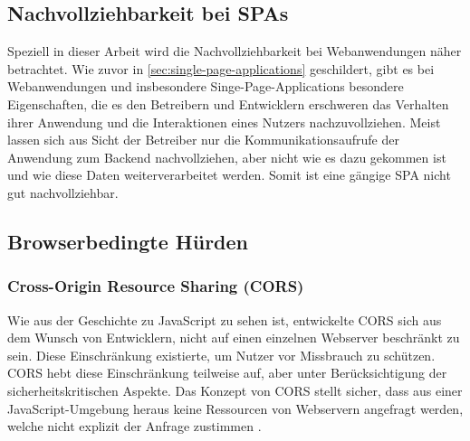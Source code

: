 \subsection{Nachvollziehbarkeit bei SPAs}
\label{sec:nachvollziehbarkeit-bei-spas}

Speziell in dieser Arbeit wird die Nachvollziehbarkeit bei Webanwendungen näher betrachtet. Wie zuvor in \autoref{sec:single-page-applications} geschildert, gibt es bei Webanwendungen und insbesondere Singe-Page-Applications besondere Eigenschaften, die es den Betreibern und Entwicklern erschweren das Verhalten ihrer Anwendung und die Interaktionen eines Nutzers nachzuvollziehen. Meist lassen sich aus Sicht der Betreiber nur die Kommunikationsaufrufe der Anwendung zum Backend nachvollziehen, aber nicht wie es dazu gekommen ist und wie diese Daten weiterverarbeitet werden. Somit ist eine gängige SPA nicht gut nachvollziehbar.
	


\subsection{Browserbedingte Hürden}


\subsubsection{Cross-Origin Resource Sharing (CORS)}

Wie aus der Geschichte zu JavaScript zu sehen ist, entwickelte CORS sich aus dem Wunsch von Entwicklern, nicht auf einen einzelnen Webserver beschränkt zu sein. Diese Einschränkung existierte, um Nutzer vor Missbrauch zu schützen. CORS hebt diese Einschränkung teilweise auf, aber unter Berücksichtigung der sicherheitskritischen Aspekte. Das Konzept von CORS stellt sicher, dass aus einer JavaScript-Umgebung heraus keine Ressourcen von Webservern angefragt werden, welche nicht explizit der Anfrage zustimmen \cite{MDNCORS}.

